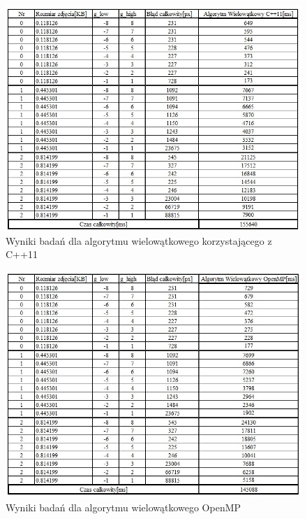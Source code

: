 \documentclass[document.tex]{subfiles}
\begin{document}
\begin{figure}[h]
\includegraphics[scale=0.75]{imgs/results_lap_cpp11_threads.jpg}
\caption{Wyniki badań dla algorytmu wielowątkowego korzystającego z C++11}
\label{fig:results_lap_cpp11_threads}
\end{figure}

\begin{figure}[h]
\includegraphics[scale=0.75]{imgs/results_lap_openmp_threads.jpg}
\caption{Wyniki badań dla algorytmu wielowątkowego OpenMP}
\label{fig:results_lap_openmp_threads}
\end{figure}
\end{document}
